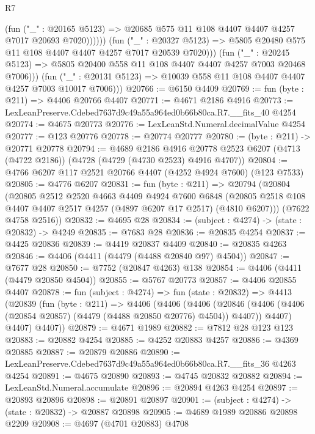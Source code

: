 \begin{lexlean}{R7}
\begin{coremodule}
                          (fun ("_" : @20165 @5123) =>
                          @20685 @575 @11 @108 @4407 @4407 @4257 @7017 @20693 @7020))))))
                (fun ("_" : @20327 @5123) =>
                @5805 @20480 @575 @11 @108 @4407 @4407 @4257 @7017 @20539 @7020)))
            (fun ("_" : @20245 @5123) =>
            @5805 @20400 @558 @11 @108 @4407 @4407 @4257 @7003 @20468 @7006)))
        (fun ("_" : @20131 @5123) => @10039 @558 @11 @108 @4407 @4407 @4257 @7003 @10017 @7006)))
@20766 := @6150 @4409
@20769 := fun (byte : @211) => @4406 @20766 @4407
@20771 := @4671 @2186 @4916
@20773 := LexLeanPreserve.Cdebed7637d9c49a55a964ed0b66b80ca.R7.__fits_40 @4254
@20774 := @4675 @20773
@20776 := LexLeanStd.Numeral.decimalValue @4254
@20777 := @123 @20776
@20778 := @20774 @20777
@20780 := (byte : @211) -> @20771 @20778
@20794 := @4689
    @2186
    @4916
    @20778
    @2523
    @6207
    (@4713 (@4722 @2186))
    (@4728 (@4729 (@4730 @2523) @4916 @4707))
@20804 := @4766 @6207 @117 @2521 @20766 @4407 (@4252 @4924 @7600) (@123 @7533)
@20805 := @4776 @6207
@20831 := fun (byte : @211) =>
  @20794
    (@20804
      (@20805
        @2512
        @2520
        @4663
        @4409
        @4924
        @7600
        @6848
        (@20805 @2518 @108 @4407 @4407 @2517 @4257 (@4897 @6207 @17 @2517) (@4810 @6207)))
      (@7622 @4758 @2516))
@20832 := @4695 @28
@20834 := (subject : @4274) -> (state : @20832) -> @4249
@20835 := @7683 @28
@20836 := @20835 @4254
@20837 := @4425 @20836
@20839 := @4419 @20837 @4409
@20840 := @20835 @4263
@20846 := @4406 (@4411 (@4479 (@4488 @20840 @97) @4504))
@20847 := @7677 @28
@20850 := @7752 (@20847 @4263) @138
@20854 := @4406 (@4411 (@4479 @20850 @4504))
@20855 := @5767 @20773
@20857 := @4406 @20855 @4407
@20878 := fun (subject : @4274) =>
  fun (state : @20832) =>
  @4413
    (@20839
      (fun (byte : @211) =>
      @4406
        (@4406
          (@4406
            (@20846 (@4406 (@4406 (@20854 @20857) (@4479 (@4488 @20850 @20776) @4504)) @4407))
            @4407)
          @4407)
        @4407))
@20879 := @4671 @1989
@20882 := @7812 @28 @123 @123
@20883 := @20882 @4254
@20885 := @4252 @20883 @4257
@20886 := @4369 @20885
@20887 := @20879 @20886
@20890 := LexLeanPreserve.Cdebed7637d9c49a55a964ed0b66b80ca.R7.__fits_36 @4263 @4254
@20891 := @4675 @20890
@20893 := @4745 @20832 @20882
@20894 := LexLeanStd.Numeral.accumulate
@20896 := @20894 @4263 @4254
@20897 := @20893 @20896
@20898 := @20891 @20897
@20901 := (subject : @4274) -> (state : @20832) -> @20887 @20898
@20905 := @4689 @1989 @20886 @20898 @2209
@20908 := @4697 (@4701 @20883) @4708

\end{coremodule}
\end{lexlean}
